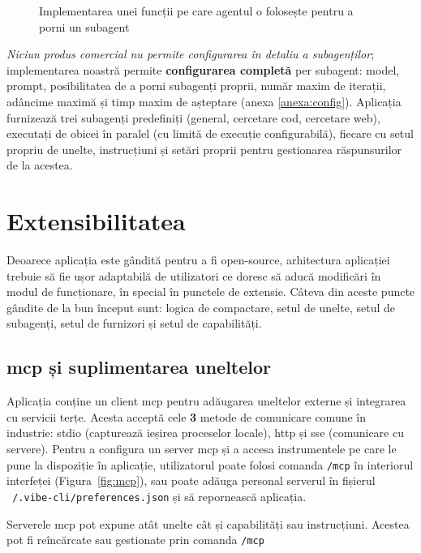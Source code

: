 \documentclass[12pt, a4paper, oneside, romanian]{teza-upb}
\begin{document}
    \begin{figure}[H]
      
      \caption{Implementarea unei funcții pe care agentul o folosește pentru a porni un subagent}
      \label{fig:subagent-py}
    \end{figure}

    \newpage 

    \textit{Niciun produs comercial nu permite configurarea în detaliu a subagenților}; implementarea noastră permite \textbf{configurarea completă} per subagent: model, prompt, posibilitatea de a porni subagenți proprii, număr maxim de iterații, adâncime maximă și timp maxim de așteptare (anexa \ref{anexa:config}). Aplicația furnizează trei subagenți predefiniți (general, cercetare cod, cercetare web), executați de obicei în paralel (cu limită de execuție configurabilă), fiecare cu setul propriu de unelte, instrucțiuni și setări proprii pentru gestionarea răspunsurilor de la acestea.

  \section{Extensibilitatea}

    Deoarece aplicația este gândită pentru a fi open-source, arhitectura aplicației trebuie să fie ușor adaptabilă de utilizatori ce doresc
    să aducă modificări în modul de funcționare, în special în punctele de extensie. Câteva din aceste puncte gândite de la bun început
    sunt: logica de compactare, setul de unelte, setul de subagenți, setul de furnizori și setul de capabilități.

    \subsection{\ac{mcp} și suplimentarea uneltelor}

    Aplicația conține un client \ac{mcp} pentru adăugarea uneltelor externe și integrarea cu servicii terțe. Acesta acceptă cele \textbf{3} metode de comunicare comune în industrie: \ac{stdio} (capturează ieșirea proceselor locale), \ac{http} și \ac{sse} (comunicare cu servere).
    Pentru a configura un server \ac{mcp} și a accesa instrumentele pe care le pune la dispoziție în aplicație, utilizatorul poate folosi comanda \texttt{/mcp} în interiorul interfeței (Figura~\ref{fig:mcp}), sau poate adăuga personal serverul în fișierul
    \texttt{~/.vibe-cli/preferences.json} și să repornească aplicația. 

    Serverele \ac{mcp} pot expune atât unelte cât și capabilități sau instrucțiuni. Acestea pot fi reîncărcate sau gestionate prin comanda \texttt{/mcp}
\end{document}
